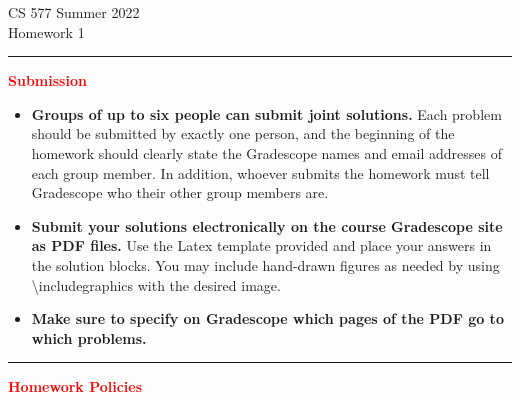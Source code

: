 \documentclass[11pt]{article}
\begin{document}

\begin{center}
    \huge CS 577 Summer 2022 \\ Homework 1
\end{center}

\hrule

\begin{center}
    \Large \textcolor{red}{\texttildelow \textbf{Submission}\texttildelow }
\end{center}

\begin{itemize}
    \item \textbf{Groups of up to six people can submit joint solutions.} Each problem should be submitted by exactly one person, and the beginning of the homework should clearly state the Gradescope names and email addresses of each group member. In addition, whoever submits the homework must tell Gradescope who their other group members are.
    
    \item \textbf{Submit your solutions electronically on the course Gradescope site as PDF files.} Use the Latex template provided and place your answers in the solution blocks. You may include hand-drawn figures as needed by using \textbackslash includegraphics with the desired image.
    \item \textbf{Make sure to specify on Gradescope which pages of the PDF go to which problems.}
\end{itemize}

\hrule

\begin{center}
    \Large \textcolor{red}{\texttildelow \textbf{Homework Policies}\texttildelow }
\end{center}
\end{document}
